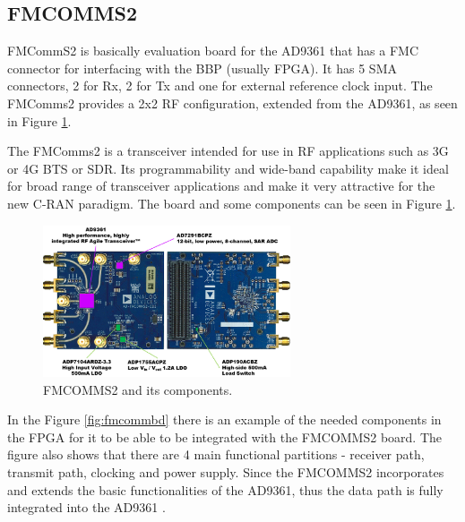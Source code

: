 \subsection{FMCOMMS2}
\label{trans:fmcomms2}

FMCommS2 is basically evaluation board for the AD9361 that has a FMC connector
for interfacing with the BBP (usually FPGA). It has 5 SMA connectors, 2 for Rx,
2 for Tx and one for external reference clock input. The FMComms2 provides a 2x2
RF configuration, extended from the AD9361, as seen in Figure \ref{fig:fmcomm}.

The FMComms2 is a transceiver intended for use in RF applications such  as 3G or
4G BTS or SDR. Its programmability and wide-band capability make it ideal for
broad range of transceiver applications and make it very attractive for the new
C-RAN paradigm. The board and some components can be seen in Figure
\ref{fig:fmcomm}.

\begin{figure}[htbp]
    \centering
    \includegraphics[width=0.65\textwidth]{./figures/fmcomms2_pic}
    \caption{ FMCOMMS2 and its components.
    \label{fig:fmcomm}}
\end{figure}




In the Figure \ref{fig:fmcommbd} there is an example of the needed components in
the FPGA for it to be able to be integrated with the FMCOMMS2 board. The figure
also shows that there are 4 main functional partitions - receiver path, transmit
path, clocking and power supply. Since the FMCOMMS2 incorporates and extends the
basic functionalities of the AD9361, thus the data path is fully integrated into
the AD9361 \cite{web:fmcomms2wiki}.

